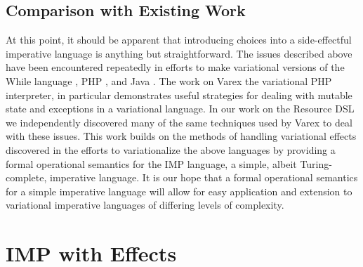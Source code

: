 \documentclass[letterpaper,10pt,onecolumn]{article}
\begin{document}
\subsection{Comparison with Existing Work}

At this point, it should be apparent that introducing choices into a side-effectful imperative language
is anything but straightforward. The issues described above have been encountered repeatedly in efforts to
make variational versions of the While language \cite{varwhile}, PHP \cite{varex}, and Java \cite{varexj}.
The work on Varex the variational PHP interpreter, in particular demonstrates useful strategies for dealing
with mutable state and exceptions in a variational language.
In our work on the Resource DSL we independently discovered many of the same techniques used by Varex
to deal with these issues.
This work builds on the methods of handling variational effects discovered in the efforts to variationalize the
above languages by providing a formal operational semantics for the IMP language, a simple, albeit Turing-complete, imperative
language. It is our hope that a formal operational semantics for a simple imperative language will allow for easy application
and extension to variational imperative languages of differing levels of complexity.

\section{IMP with Effects}
\end{document}
